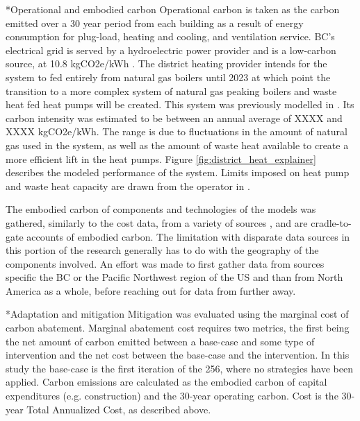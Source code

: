 \documentclass[twocolumn, a4paper,10pt]{article}
\makeatletter
\renewcommand\subsection{\@startsection{subsection}{1}{\z@}{\z@}{\z@}{\normalfont\normalsize\bfseries}}
\renewcommand\subsection{\@startsection{subsection}{1}{\z@}{\z@}{0.1pt}{\normalfont\normalsize\bfseries}}
\makeatother
\begin{document}
\begin{equation}\label{eq:TAC}
  
\end{equation}

\subsection*{Operational and embodied carbon}
Operational carbon is taken as the carbon emitted over a 30 year period from each building as a result of energy consumption for plug-load, heating and cooling, and ventilation service. BC's electrical grid is served by a hydroelectric power provider and is a low-carbon source, at 10.8 kgCO2e/kWh \citep{BC hydro methods}. The district heating provider intends for the system to fed entirely from natural gas boilers until 2023 at which point the transition to a more complex system of natural gas peaking boilers and waste heat fed heat pumps will be created. This system was previously modelled in \citet{SRN paper}. Its carbon intensity was estimated to be between an annual average of XXXX and XXXX kgCO2e/kWh. The range is due to fluctuations in the amount of natural gas used in the system, as well as the amount of waste heat available to create a more efficient lift in the heat pumps. Figure \ref{fig:district_heat_explainer} describes the modeled performance of the system. Limits imposed on heat pump and waste heat capacity are drawn from the operator in \citet{CORIX infrastructure agreement}.

The embodied carbon of components and technologies of the models was gathered, similarly to the cost data, from a variety of sources \citep{embodied carbon sources}, and are cradle-to-gate accounts of embodied carbon. The limitation with disparate data sources in this portion of the research generally has to do with the geography of the components involved. An effort was made to first gather data from sources specific the BC or the Pacific Northwest region of the US and than from North America as a whole, before reaching out for data from further away. 

\subsection*{Adaptation and mitigation}
Mitigation was evaluated using the marginal cost of carbon abatement. Marginal abatement cost requires two metrics, the first being the net amount of carbon emitted between a base-case and some type of intervention and the net cost between the base-case and the intervention. In this study the base-case is the first iteration of the 256, where no strategies have been applied. Carbon emissions are calculated as the embodied carbon of capital expenditures (e.g. construction) and the 30-year operating carbon. Cost is the 30-year Total Annualized Cost, as described above. 
\end{document}
